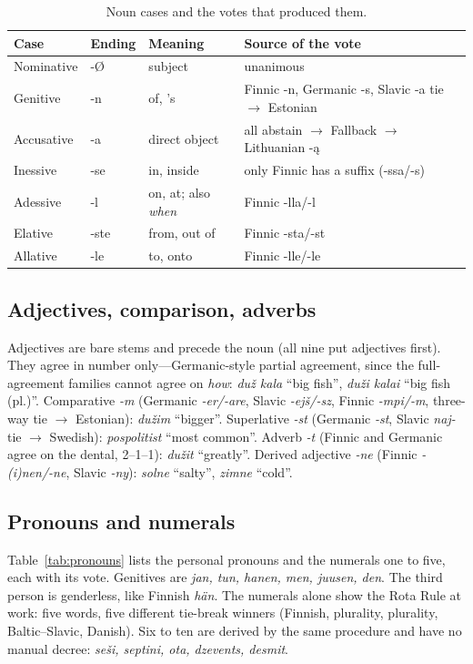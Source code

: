 \begin{table}[t]
\centering\small
\caption{Noun cases and the votes that produced them.}
\label{tab:cases}
\setlength{\tabcolsep}{4pt}
\begin{tabular}{@{}llp{1.8cm}p{2.9cm}@{}}
\toprule
Case & Ending & Meaning & Source of the vote \\
\midrule
Nominative & -Ø & subject & unanimous \\
Genitive & -n & of, 's & Finnic -n, Germanic -s, Slavic -a tie $\rightarrow$ Estonian \\
Accusative & -a & direct object & all abstain $\rightarrow$ Fallback $\rightarrow$ Lithuanian -ą \\
Inessive & -se & in, inside & only Finnic has a suffix (-ssa/-s) \\
Adessive & -l & on, at; also \emph{when} & Finnic -lla/-l \\
Elative & -ste & from, out of & Finnic -sta/-st \\
Allative & -le & to, onto & Finnic -lle/-le \\
\bottomrule
\end{tabular}
\end{table}

\subsection{Adjectives, comparison, adverbs}
Adjectives are bare stems and precede the noun (all nine put adjectives first). They agree in number only---Germanic-style partial agreement, since the full-agreement families cannot agree on \emph{how}: \emph{duž kala} ``big fish'', \emph{duži kalai} ``big fish (pl.)''. Comparative \emph{-m} (Germanic \emph{-er/-are}, Slavic \emph{-ejš/-sz}, Finnic \emph{-mpi/-m}, three-way tie $\rightarrow$ Estonian): \emph{dužim} ``bigger''. Superlative \emph{-st} (Germanic \emph{-st}, Slavic \emph{naj-} tie $\rightarrow$ Swedish): \emph{pospolitist} ``most common''. Adverb \emph{-t} (Finnic and Germanic agree on the dental, 2--1--1): \emph{dužit} ``greatly''. Derived adjective \emph{-ne} (Finnic \emph{-(i)nen/-ne}, Slavic \emph{-ny}): \emph{solne} ``salty'', \emph{zimne} ``cold''.

\subsection{Pronouns and numerals}\label{sec:pronouns}
Table~\ref{tab:pronouns} lists the personal pronouns and the numerals one to five, each with its vote. Genitives are \emph{jan, tun, hanen, men, juusen, den}. The third person is genderless, like Finnish \emph{hän}. The numerals alone show the Rota Rule at work: five words, five different tie-break winners (Finnish, plurality, plurality, Baltic--Slavic, Danish). Six to ten are derived by the same procedure and have no manual decree: \emph{seši, septini, ota, dzevents, desmit}.

